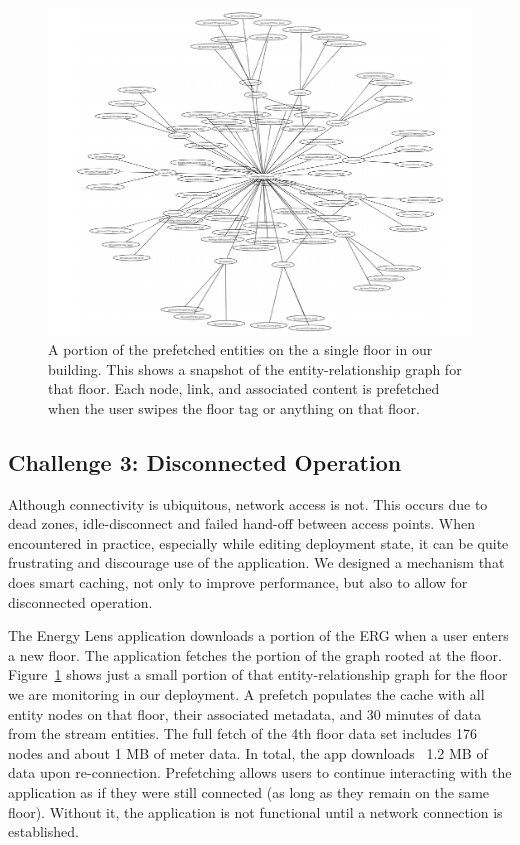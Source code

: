 \begin{figure}[htb!]
\begin{center}
\includegraphics[scale=0.45]{figs/SDH_4F_ERG_closeup}
\caption{A portion of the prefetched entities on the a single floor in our building.  This shows a snapshot of the entity-relationship
graph for that floor.  Each node, link, and associated content is prefetched when the user swipes the floor
tag or anything on that floor.}
\label{fig:sdh_4f_erg}
\end{center}
\end{figure}




\subsection{Challenge 3: Disconnected Operation}
Although connectivity is ubiquitous, network access is not.  This occurs due to dead zones, 
idle-disconnect and failed hand-off between access points.  When encountered in practice, especially while editing
deployment state, it can be quite frustrating and discourage use of the application.  We designed a
mechanism that does smart caching, not only to improve performance, but also to allow for disconnected operation.

The Energy Lens application downloads a portion of the ERG when a user enters a new floor.  The application fetches the portion
of the graph rooted at the floor.  
Figure~\ref{fig:sdh_4f_erg} shows just a small portion of that entity-relationship graph for the floor we are monitoring in
our deployment.  
A prefetch populates the cache with all entity nodes on that floor, their associated metadata,
and 30 minutes of data from the stream entities.  The full fetch of the 4th floor data set includes
176 nodes and about 1 MB of meter data.  In total, the app downloads ~1.2 MB of data upon re-connection.
Prefetching allows users to continue interacting with the application as if they were still connected (as long as they remain on
the same floor).  Without it, the application is not functional until a network connection is established.

